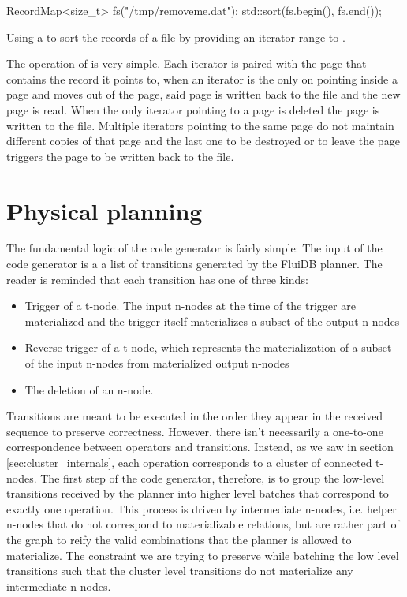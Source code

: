 \begin{code}
\begin{cppcode}
RecordMap<size_t> fs("/tmp/removeme.dat");
std::sort(fs.begin(), fs.end());
\end{cppcode}
  \caption{\label{lst:record_map_sort}Using a  to sort
    the records of a file by providing an iterator range to .}
\end{code}

The operation of  is very simple. Each iterator is
paired with the page that contains the record it points to, when an
iterator is the only on pointing inside a page and moves out of the
page, said page is written back to the file and the new page is
read. When the only iterator pointing to a page is deleted the page is
written to the file. Multiple iterators pointing to the same page do
not maintain different copies of that page and the last one to be
destroyed or to leave the page triggers the page to be written back to
the file.

\section{Physical planning}

The fundamental logic of the code generator is fairly simple: The
input of the code generator is a a list of transitions generated by
the FluiDB planner. The reader is reminded that each transition has
one of three kinds:

\begin{itemize}
\item Trigger of a t-node. The input n-nodes at the time of the trigger
are materialized and the trigger itself materializes a subset of the
output n-nodes
\item Reverse trigger of a t-node, which represents the
materialization of a subset of the input n-nodes from materialized
output n-nodes
\item The deletion of an n-node.
\end{itemize}

Transitions are meant to be executed in the order they appear in the
received sequence to preserve correctness. However, there isn't necessarily a
one-to-one correspondence between operators and transitions. Instead,
as we saw in section \ref{sec:cluster_internals}, each operation
corresponds to a cluster of connected t-nodes. The first step of the
code generator, therefore, is to group the low-level transitions
received by the planner into higher level batches that correspond to
exactly one operation. This process is driven by intermediate n-nodes,
i.e. helper n-nodes that do not correspond to materializable relations,
but are rather part of the graph to reify the valid combinations that
the planner is allowed to materialize. The constraint we are trying to
preserve while batching the low level transitions such that the
cluster level transitions do not materialize any intermediate n-nodes.

